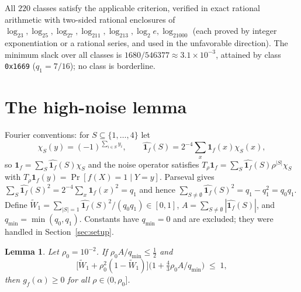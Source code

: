 \documentclass[12pt,draftclsnofoot,onecolumn,journal]{IEEEtran}
\newtheorem{lemma}{Lemma}
\newcommand{\ind}[1]{\mathbf{1}_{#1}}
\begin{document}
All $220$ classes satisfy the applicable criterion, verified in exact
rational arithmetic with two-sided rational enclosures of
$\log_23,\log_25,\log_27,\log_211,\log_213,\log_2e,\log_21000$ (each proved
by integer exponentiation or a rational series, and used in the unfavorable
direction). The minimum slack over all classes is
$1680/546377\approx3.1\times10^{-3}$, attained by class \texttt{0x1669}
($q_1=7/16$); no class is borderline.

\section{The high-noise lemma}

Fourier conventions: for $S\subseteq\{1,\dots,4\}$ let
\[
\chi_S(y)=(-1)^{\sum_{i\in S}y_i},\qquad
\widehat{\ind f}(S)=2^{-4}\sum_x\ind f(x)\chi_S(x),
\]
so $\ind f=\sum_S\widehat{\ind f}(S)\chi_S$ and the noise operator satisfies
$T_\rho\ind f=\sum_S\widehat{\ind f}(S)\rho^{|S|}\chi_S$ with
$T_\rho\ind f(y)=\Pr[f(X)=1\mid Y=y]$. Parseval gives
$\sum_S\widehat{\ind f}(S)^2=2^{-4}\sum_x\ind f(x)^2=q_1$ and hence
$\sum_{S\neq\emptyset}\widehat{\ind f}(S)^2=q_1-q_1^2=q_0q_1$. Define
$\widetilde W_1=\sum_{|S|=1}\widehat{\ind f}(S)^2/(q_0q_1)\in[0,1]$,
$A=\sum_{S\neq\emptyset}|\widehat{\ind f}(S)|$, and
$q_{\min}=\min(q_0,q_1)$. Constants have $q_{\min}=0$ and are excluded; they
were handled in Section~\ref{sec:setup}.

\begin{lemma}\label{lem:high}
Let $\rho_0=10^{-2}$. If $\rho_0A/q_{\min}\le\tfrac12$ and
\[
\bigl[\widetilde W_1+\rho_0^2(1-\widetilde W_1)\bigr]
\bigl(1+\tfrac43\rho_0A/q_{\min}\bigr)\;\le\;1,
\]
then $g_f(\alpha)\ge0$ for all $\rho\in(0,\rho_0]$.
\end{lemma}
\end{document}
